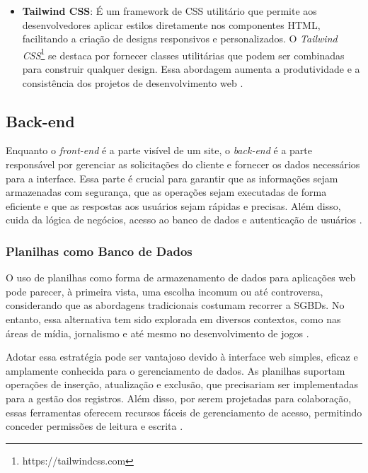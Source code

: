 \begin{itemize}
\begin{itemize}
    \end{itemize}
    \item \textbf{Tailwind CSS}: É um framework de CSS utilitário que permite aos desenvolvedores aplicar estilos diretamente nos componentes HTML, facilitando a criação de designs responsivos e personalizados. O \textit{Tailwind CSS}\footnote{https://tailwindcss.com} se destaca por fornecer classes utilitárias que podem ser combinadas para construir qualquer design. Essa abordagem aumenta a produtividade e a consistência dos projetos de desenvolvimento web \cite{bosco2024crefide}.
\end{itemize}

\subsection{Back-end}

Enquanto o \textit{front-end} é a parte visível de um site, o \textit{back-end} é a parte responsável por gerenciar as solicitações do cliente e fornecer os dados necessários para a interface. Essa parte é crucial para garantir que as informações sejam armazenadas com segurança, que as operações sejam executadas de forma eficiente e que as respostas aos usuários sejam rápidas e precisas. Além disso, cuida da lógica de negócios, acesso ao banco de dados e autenticação de usuários \cite{garcia2024plataforma}.

\subsubsection{Planilhas como Banco de Dados}

O uso de planilhas como forma de armazenamento de dados para aplicações web pode parecer, à primeira vista, uma escolha incomum ou até controversa, considerando que as abordagens tradicionais costumam recorrer a SGBDs. No entanto, essa alternativa tem sido explorada em diversos contextos, como nas áreas de mídia, jornalismo e até mesmo no desenvolvimento de jogos \cite{schwertnercharao:hal-02119998}.

Adotar essa estratégia pode ser vantajoso devido à interface web simples, eficaz e amplamente conhecida para o gerenciamento de dados. As planilhas suportam operações de inserção, atualização e exclusão, que precisariam ser implementadas para a gestão dos registros. Além disso, por serem projetadas para colaboração, essas ferramentas oferecem recursos fáceis de gerenciamento de acesso, permitindo conceder permissões de leitura e escrita \cite{schwertnercharao:hal-02119998}.

